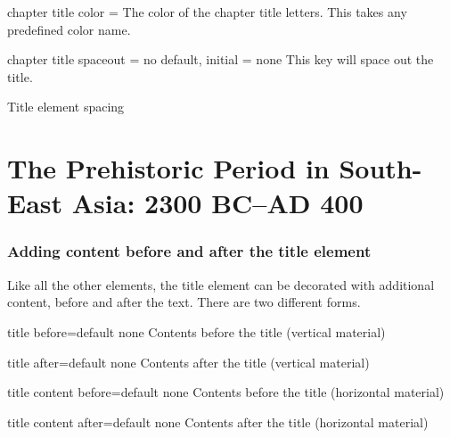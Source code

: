 \begin{decription}
{\begin{docKey}[phd]{chapter title color} { = } {}
The color of the chapter title letters. This takes any predefined color name. 
\end{docKey}


\begin{docKey}[phd]{chapter title spaceout}{ = } {no default, initial = none}
 This key will space out the title. 
\end{docKey}

\begin{texexample}{Title element spacing}{}
\chapter{The Prehistoric Period in South-East Asia: 2300 BC--AD 400}        
\lorem 
    
\end{texexample}


\subsection*{Adding content before and after the title element}

Like all the other elements, the title element can be decorated with additional content,
before and after the text. There are two different forms. 

\begin{docKey}[phd]{title before}{=}{default none}
Contents before the title (vertical material)
\end{docKey}

\begin{docKey}[phd]{title after}{=}{default none}
Contents after the title (vertical material)
\end{docKey}

\begin{docKey}[phd]{title content before}{=}{default none}
Contents before the title (horizontal material)
\end{docKey}

\begin{docKey}[phd]{title content after}{=}{default none}
Contents after the title (horizontal material)
\end{docKey}

}
\end{decription}
